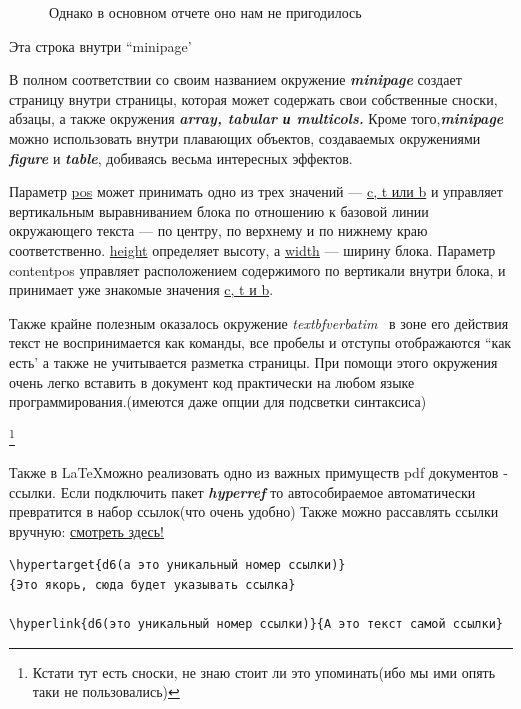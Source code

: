 \documentclass[14pt, a4paper]{extarticle}
\begin{document}
\begin{figure}[h!]
\setlength{\fboxsep}{0pt}%
\setlength{\fboxrule}{2pt}%
%
\caption{Однако в основном отчете оно нам не пригодилось}
\end{figure}

\begin{minipage}[c][2cm][c]{9cm} 
Эта строка внутри ``minipage'
\end{minipage}
В полном соответствии со своим названием окружение \textsl{\textbf{minipage}} создает страницу внутри страницы, которая может содержать свои собственные сноски, абзацы, а также окружения \textsl{\textbf{ array, tabular и multicols.}} Кроме того,\textsl{\textbf{minipage}} можно использовать внутри плавающих объектов, создаваемых окружениями \textsl{\textbf{figure}} и \textsl{\textbf{table}}, добиваясь весьма интересных эффектов.

Параметр \underline{pos} может принимать одно из трех значений — \underline{c, t или b} и управляет вертикальным выравниванием блока по отношению к базовой линии окружающего текста — по центру, по верхнему и по нижнему краю соответственно. \underline{height} определяет высоту, а \underline{width} — ширину блока. Параметр contentpos управляет расположением содержимого по вертикали внутри блока, и принимает уже знакомые значения \underline{c, t и b}.

Также крайне полезным оказалось окружение \textsl{textbf{verbatim}} \ в зоне его действия текст не воспринимается как команды, все пробелы и отступы отображаются ``как есть' а также не учитывается разметка страницы. При помощи этого окружения очень легко вставить в документ код практически на любом языке программирования.(имеются даже опции для подсветки синтаксиса)





\footnote{Кстати тут есть сноски, не знаю стоит ли это упоминать(ибо мы ими опять таки не пользовались)}

Также в \LaTeX можно реализовать одно из важных примуществ pdf документов - ссылки. Если подключить пакет \textsl{\textbf{hyperref}} то автособираемое автоматически превратится в набор ссылок(что очень удобно) Также можно рассавлять ссылки вручную: %
\newpage
\hyperlink{D12}{смотреть здесь!}
\begin{verbatim}
\hypertarget{d6(а это уникальный номер ссылки)} 
{Это якорь, сюда будет указывать ссылка}

\hyperlink{d6(это уникальный номер ссылки)}{А это текст самой ссылки}
\end{verbatim}
\end{document}

